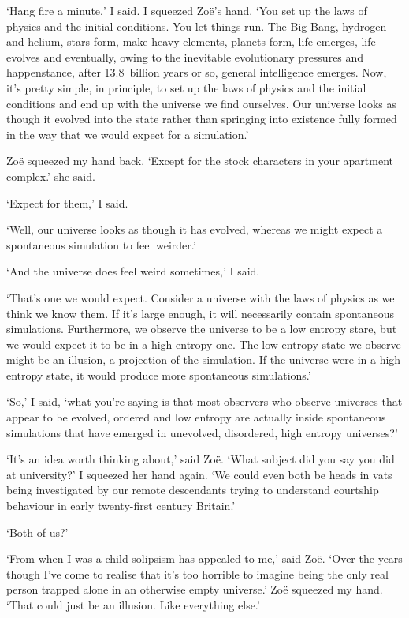 `Hang fire a minute,' I said. I squeezed Zoë's hand. `You set up
the laws of physics and the initial conditions. You let things run.
The Big Bang, hydrogen and helium, stars form, make heavy elements,
planets form, life emerges, life evolves and eventually, owing to
the inevitable evolutionary pressures and happenstance, after
13.8~billion years or so, general intelligence emerges. Now, it's
pretty simple, in principle, to set up the laws of physics and the
initial conditions and end up with the universe we find ourselves.
Our universe looks as though it evolved into the state rather than
springing into existence fully formed in the way that we would
expect for a simulation.'

Zoë squeezed my hand back. `Except for the stock characters in
your apartment complex.' she said.

`Expect for them,' I said.

`Well, our universe looks as though it has evolved, whereas we might
expect a spontaneous simulation to feel weirder.'

`And the universe does feel weird sometimes,' I said.

`That's one we would expect. Consider a universe with the laws of
physics as we think we know them. If it's large enough, it will
necessarily contain spontaneous simulations. Furthermore, we observe
the universe to be a low entropy stare, but we would expect it to be in
a high entropy one. The low entropy state we observe might be an
illusion, a projection of the simulation. If the universe were in a
high entropy state, it would produce more spontaneous simulations.'

`So,' I said, `what you're saying is that most observers who observe
universes that appear to be evolved, ordered and low entropy are
actually inside spontaneous simulations that have emerged in
unevolved, disordered, high entropy universes?'

`It's an idea worth thinking about,' said Zoë. `What subject did
you say you did at university?' I squeezed her hand again. `We
could even both be heads in vats being investigated by our remote
descendants trying to understand courtship behaviour in early
twenty-first century Britain.'

`Both of us?'

`From when I was a child solipsism has appealed to me,' said
Zoë. `Over the years though I've come to realise that it's too
horrible to imagine being the only real person trapped alone in an
otherwise empty universe.' Zoë squeezed my hand. `That could
just be an illusion. Like everything else.'

